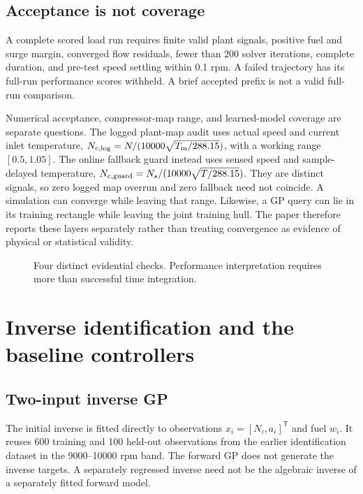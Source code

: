 \documentclass[11pt,a4paper,oneside]{report}
\begin{document}
\section{Acceptance is not coverage}
A complete scored load run requires finite valid plant signals, positive fuel and surge margin, converged flow residuals, fewer than 200 solver iterations, complete duration, and pre-test speed settling within 0.1 rpm. A failed trajectory has its full-run performance scores withheld. A brief accepted prefix is not a valid full-run comparison.

Numerical acceptance, compressor-map range, and learned-model coverage are separate questions. The logged plant-map audit uses actual speed and current inlet temperature,
$N_{c,\rm log}=N/(10000\sqrt{T_{\rm in}/288.15})$, with a working range $[0.5,1.05]$.
The online fallback guard instead uses sensed speed and sample-delayed temperature,
$N_{c,\rm guard}=N_s/(10000\sqrt{T/288.15})$.
They are distinct signals, so zero logged map overrun and zero fallback need not coincide. A simulation can converge while leaving that range. Likewise, a GP query can lie in its training rectangle while leaving the joint training hull. The paper therefore reports these layers separately rather than treating convergence as evidence of physical or statistical validity.
\begin{figure}[htbp]\centering\diagramEvidence
\caption{Four distinct evidential checks. Performance interpretation requires more than successful time integration.}\label{fig:evidence}\end{figure}

\chapter{Inverse identification and the baseline controllers}
\section{Two-input inverse GP}
The initial inverse is fitted directly to observations $x_i=[N_i,a_i]^\mathsf T$ and fuel $w_i$. It reuses 600 training and 100 held-out observations from the earlier identification dataset in the 9000--10000 rpm band. The forward GP does not generate the inverse targets. A separately regressed inverse need not be the algebraic inverse of a separately fitted forward model.
\end{document}
